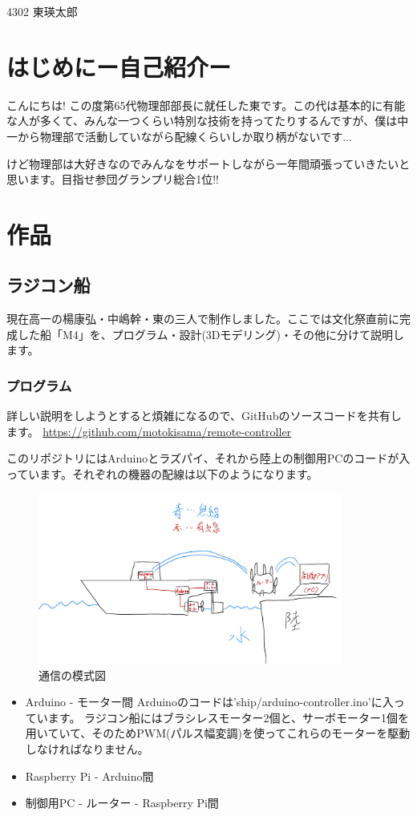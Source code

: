 \documentclass[b5paper,papersize,twoside,dvipdfmx]{jsarticle}
\begin{document}
\begin{center}
\Large 4302 東瑛太郎
\end{center}
\section{はじめにー自己紹介ー}
こんにちは! この度第65代物理部部長に就任した東です。この代は基本的に有能な人が多くて、みんな一つくらい特別な技術を持ってたりするんですが、僕は中一から物理部で活動していながら配線くらいしか取り柄がないです...

けど物理部は大好きなのでみんなをサポートしながら一年間頑張っていきたいと思います。目指せ参団グランプリ総合1位!!
\section{作品}
\subsection{ラジコン船}
現在高一の楊康弘・中嶋幹・東の三人で制作しました。ここでは文化祭直前に完成した船「M4」を、プログラム・設計(3Dモデリング)・その他に分けて説明します。
\subsubsection{プログラム}
詳しい説明をしようとすると煩雑になるので、GitHubのソースコードを共有します。
\url{https://github.com/motokisama/remote-controller}

このリポジトリにはArduinoとラズパイ、それから陸上の制御用PCのコードが入っています。それぞれの機器の配線は以下のようになります。
\begin{figure}[htbp]
\centering
\includegraphics[width=100mm]{./remote_controller.png} 
\caption{通信の模式図}
\label{fugafuga}
\end{figure}

\begin{itemize}
  \item Arduino - モーター間
  Arduinoのコードは'ship/arduino-controller.ino'に入っています。
  ラジコン船にはブラシレスモーター2個と、サーボモーター1個を用いていて、そのためPWM(パルス幅変調)を使ってこれらのモーターを駆動しなければなりません。
  \item Raspberry Pi - Arduino間
  
  \item 制御用PC - ルーター - Raspberry Pi間
\end{itemize}
\end{document}
